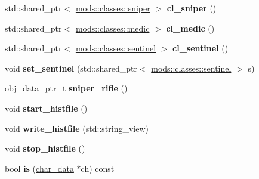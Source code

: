 \begin{DoxyCompactItemize}
\item 
\mbox{\label{classmods_1_1player_aa24993316846c4d1a07ba50cc9f91504}} 
std\+::shared\+\_\+ptr$<$ \hyperlink{structmods_1_1classes_1_1sniper}{mods\+::classes\+::sniper} $>$ {\bfseries cl\+\_\+sniper} ()
\item 
\mbox{\label{classmods_1_1player_aff434718fc2b2d0c16097171d38a2bbc}} 
std\+::shared\+\_\+ptr$<$ \hyperlink{structmods_1_1classes_1_1medic}{mods\+::classes\+::medic} $>$ {\bfseries cl\+\_\+medic} ()
\item 
\mbox{\label{classmods_1_1player_a8877f7dd1e695ce9b0ce29ee776c7136}} 
std\+::shared\+\_\+ptr$<$ \hyperlink{structmods_1_1classes_1_1sentinel}{mods\+::classes\+::sentinel} $>$ {\bfseries cl\+\_\+sentinel} ()
\item 
\mbox{\label{classmods_1_1player_aecd6fc80087322dac1e7475cd85cc37f}} 
void {\bfseries set\+\_\+sentinel} (std\+::shared\+\_\+ptr$<$ \hyperlink{structmods_1_1classes_1_1sentinel}{mods\+::classes\+::sentinel} $>$ s)
\item 
\mbox{\label{classmods_1_1player_abd11111bfe0fc2c61e244e539ef4f27f}} 
obj\+\_\+data\+\_\+ptr\+\_\+t {\bfseries sniper\+\_\+rifle} ()
\item 
\mbox{\label{classmods_1_1player_a976af91450f06af213f9258ca7be0427}} 
void {\bfseries start\+\_\+histfile} ()
\item 
\mbox{\label{classmods_1_1player_ae399e28d13428ef0dc3800bad3e05b5b}} 
void {\bfseries write\+\_\+histfile} (std\+::string\+\_\+view)
\item 
\mbox{\label{classmods_1_1player_a39bb8831e0f6f05988041f270fa99522}} 
void {\bfseries stop\+\_\+histfile} ()
\item 
\mbox{\label{classmods_1_1player_a9a30e134073f21fc5bf5b60425e93028}} 
bool {\bfseries is} (\hyperlink{structchar__data}{char\+\_\+data} $\ast$ch) const
\item 
\mbox{\label{classmods_1_1player_a44c0e06e4d068226a8fc1c8fc315c259}} 

\end{DoxyCompactItemize}
